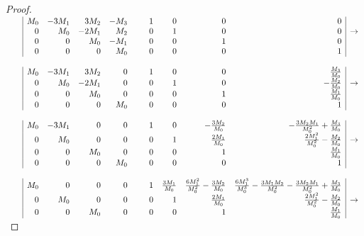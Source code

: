 \begin{proof}
\begin{math}
  \begin{array}{rr|rrrr@{\hspace{3ex}\hspace{3ex}}rrrr|c}
    && M_0 & -3M_1 &  3M_2 & -M_3  & 1 & 0 & 0 & 0 &             \\
    &&   0 &   M_0 & -2M_1 &  M_2  & 0 & 1 & 0 & 0 & \rightarrow \\
    &&   0 &     0 &   M_0 & -M_1  & 0 & 0 & 1 & 0 &             \\
    &&   0 &     0 &     0 &  M_0  & 0 & 0 & 0 & 1 &
    \\ \\
    && M_0 & -3M_1 &  3M_2 &    0  & 1 & 0 & 0 &  \frac{M_3}{M_0} &             \\
    &&   0 &   M_0 & -2M_1 &    0  & 0 & 1 & 0 & -\frac{M_2}{M_0} & \rightarrow \\
    &&   0 &     0 &   M_0 &    0  & 0 & 0 & 1 &  \frac{M_1}{M_0} &             \\
    &&   0 &     0 &     0 &  M_0  & 0 & 0 & 0 &  1               &
    \\ \\
    && M_0 & -3M_1 &     0 &    0  & 1 & 0 & -\frac{3M_2}{M_0} & -\frac{3M_2M_1}{M_0^2}+\frac{M_3}{M_0} &             \\
    &&   0 &   M_0 &     0 &    0  & 0 & 1 &  \frac{2M_1}{M_0} & \frac{2M_1^2}{M_0^2}-\frac{M_2}{M_0}   & \rightarrow \\
    &&   0 &     0 &   M_0 &    0  & 0 & 0 &  1                &  \frac{M_1}{M_0}                       &             \\
    &&   0 &     0 &     0 &  M_0  & 0 & 0 &  0                &  1                                     &
    \\ \\
    && M_0 &     0 &     0 &    0  & 1 & \frac{3M_1}{M_0} & \frac{6M_1^2}{M_0^2}-\frac{3M_2}{M_0} & \frac{6M_1^3}{M_0^3}-\frac{3M_1M_2}{M_0^2} - \frac{3M_2M_1}{M_0^2}+\frac{M_3}{M_0} &             \\
    &&   0 &   M_0 &     0 &    0  & 0 & 1                &  \frac{2M_1}{M_0}                     & \frac{2M_1^2}{M_0^2}-\frac{M_2}{M_0}                                               & \rightarrow \\
    &&   0 &     0 &   M_0 &    0  & 0 & 0                &  1                                    & \frac{M_1}{M_0}                                                                    &             \\

\end{array}
\end{math}
\end{proof}
